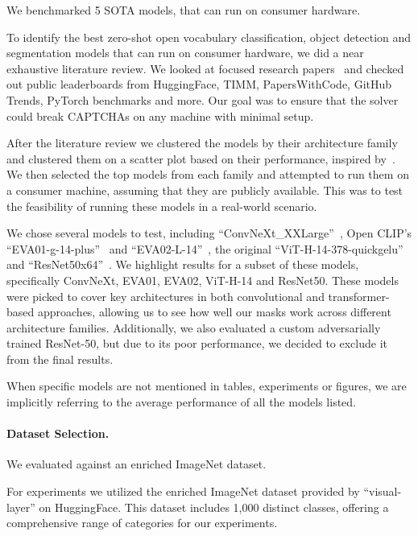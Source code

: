 \documentclass[a4paper, oneside]{discothesis}
\begin{document}
We benchmarked 5 SOTA models, that can run on consumer hardware.

To identify the best zero-shot open vocabulary classification, object detection and segmentation models that can run on consumer hardware, we did a near exhaustive literature review. We looked at focused research papers~\cite{wang2024benchmarking, goldblum2024battle} and checked out public leaderboards from HuggingFace, TIMM, PapersWithCode, GitHub Trends, PyTorch benchmarks and more. Our goal was to ensure that the solver could break CAPTCHAs on any machine with minimal setup.

After the literature review we clustered the models by their architecture family and clustered them on a scatter plot based on their performance, inspired by~\cite{howard_image_models}. We then selected the top models from each family and attempted to run them on a consumer machine, assuming that they are publicly available. This was to test the feasibility of running these models in a real-world scenario.

We chose several models to test, including ``ConvNeXt\_XXLarge''~\cite{Liu_2022_CVPR}, Open CLIP's ``EVA01-g-14-plus''~\cite{Fang_2023_CVPR} and ``EVA02-L-14''~\cite{fang2024eva}, the original ``ViT-H-14-378-quickgelu''~\cite{dosovitskiy2021imageworth16x16words} and ``ResNet50x64''~\cite{He_2015_ICCV}. We highlight results for a subset of these models, specifically ConvNeXt, EVA01, EVA02, ViT-H-14 and ResNet50. These models were picked to cover key architectures in both convolutional and transformer-based approaches, allowing us to see how well our masks work across different architecture families. Additionally, we also evaluated a custom adversarially trained ResNet-50, but due to its poor performance, we decided to exclude it from the final results.

When specific models are not mentioned in tables, experiments or figures, we are implicitly referring to the average performance of all the models listed.

\paragraph{Dataset Selection.}

We evaluated against an enriched ImageNet dataset.

For experiments we utilized the enriched ImageNet dataset provided by ``visual-layer'' on HuggingFace. This dataset includes 1,000 distinct classes, offering a comprehensive range of categories for our experiments.
\end{document}

